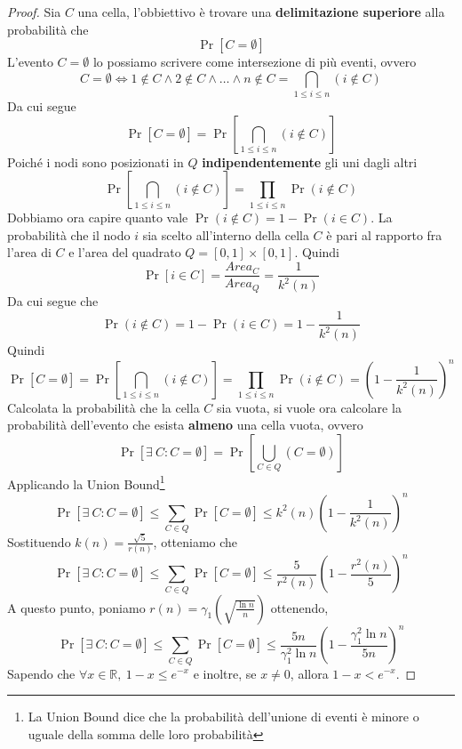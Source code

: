 \begin{proof}
 Sia $C$ una cella, l'obbiettivo è trovare una \textbf{delimitazione superiore} alla probabilità che 
\[\Pr[C = \emptyset]\]
L'evento $C = \emptyset$ lo possiamo scrivere come intersezione di più eventi, ovvero
\[
C = \emptyset \iff 1 \notin C \land 2 \notin C \land \dots \land n \notin C = \bigcap_{1 \leq i \leq n}(i \notin C)
\]
Da cui segue
\[
\Pr[C = \emptyset] = \Pr\left[\bigcap_{1 \leq i \leq n}(i \notin C)\right]
\]
Poiché i nodi sono posizionati in $Q$ \textbf{indipendentemente} gli uni dagli altri
\[
\Pr\left[\bigcap_{1 \leq i \leq n}(i \notin C)\right] = \prod_{1 \leq i \leq n}\Pr(i \notin C)
\]
Dobbiamo ora capire quanto vale $\Pr(i \notin C) = 1 - \Pr(i \in C)$. La probabilità che il nodo $i$ sia scelto all'interno della cella $C$ è pari al rapporto fra l'area di $C$ e l'area del quadrato $Q = [0,1] \times [0,1]$. Quindi
\[
\Pr[i \in C] = \frac{Area_C}{Area_Q} = \frac{1}{k^2(n)}
\]
Da cui segue che
\[
\Pr(i \notin C) = 1 - \Pr(i \in C) = 1 - \frac{1}{k^2(n)}
\]
Quindi
\[
\Pr[C = \emptyset] = \Pr\left[\bigcap_{1 \leq i \leq n}(i \notin C)\right] = \prod_{1 \leq i \leq n}\Pr(i \notin C) = \left(1 - \frac{1}{k^2(n)}\right)^n
\]
Calcolata la probabilità che la cella $C$ sia vuota, si vuole ora calcolare la probabilità dell'evento che esista \textbf{almeno} una cella vuota, ovvero
\[
\Pr[\exists\ C: C = \emptyset] = \Pr\left[\bigcup_{C \in Q}(C = \emptyset)\right]
\]
Applicando la Union Bound\footnote{La Union Bound dice che la probabilità dell'unione di eventi è minore o uguale della somma delle loro probabilità}
\[
\Pr[\exists\ C: C = \emptyset] \leq \sum_{C \in Q}\Pr[C = \emptyset] \leq k^2(n)\left(1 - \frac{1}{k^2(n)}\right)^n
\]
Sostituendo $k(n) = \frac{\sqrt{5}}{r(n)}$, otteniamo che
\[
\Pr[\exists\ C: C = \emptyset] \leq \sum_{C \in Q}\Pr[C = \emptyset] \leq \frac{5}{r^2(n)}\left(1 - \frac{r^2(n)}{5}\right)^n
\]
A questo punto, poniamo $r(n) = \gamma_1\left(\sqrt{\frac{\ln n}{n}}\right)$ ottenendo,
\[
\Pr[\exists\ C: C = \emptyset] \leq \sum_{C \in Q}\Pr[C = \emptyset] \leq \frac{5n}{\gamma_1^2\ln n}\left(1 - \frac{\gamma_1^2\ln n}{5n}\right)^n
\]
Sapendo che $\forall x \in \mathbb{R},\ 1 - x \leq e^{-x}$ e inoltre, se $x \neq 0$, allora $1 - x < e^{-x}$.


\end{proof}
